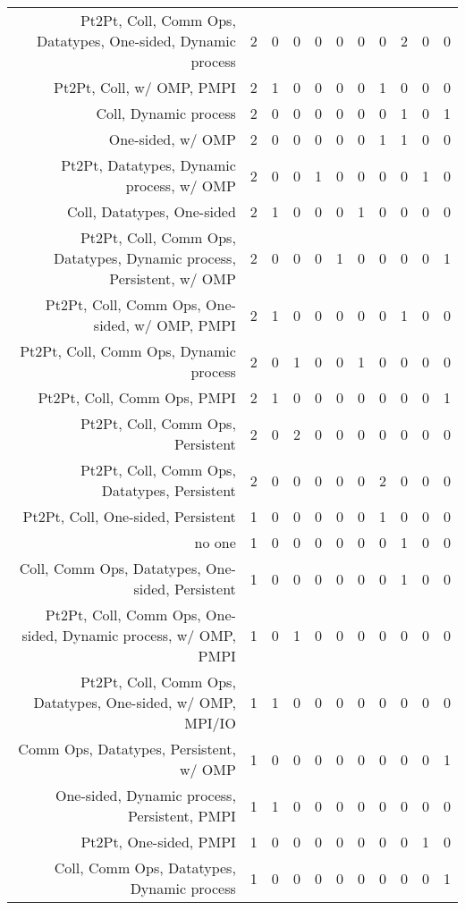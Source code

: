 {\begin{landscape}
\begin{longtable}[htb]{r|c|c|c|c|c|c|c|c|c|c}
{Pt2Pt, Coll, Comm Ops, Datatypes, One-sided, Dynamic process} & 2 & 0 & 0 & 0 & 0 & 0 & 0 & 2 & 0 & 0 \\%
{Pt2Pt, Coll, w/ OMP, PMPI} & 2 & 1 & 0 & 0 & 0 & 0 & 1 & 0 & 0 & 0 \\%
{Coll, Dynamic process} & 2 & 0 & 0 & 0 & 0 & 0 & 0 & 1 & 0 & 1 \\%
{One-sided, w/ OMP} & 2 & 0 & 0 & 0 & 0 & 0 & 1 & 1 & 0 & 0 \\%
{Pt2Pt, Datatypes, Dynamic process, w/ OMP} & 2 & 0 & 0 & 1 & 0 & 0 & 0 & 0 & 1 & 0 \\%
{Coll, Datatypes, One-sided} & 2 & 1 & 0 & 0 & 0 & 1 & 0 & 0 & 0 & 0 \\%
{Pt2Pt, Coll, Comm Ops, Datatypes, Dynamic process, Persistent, w/ OMP} & 2 & 0 & 0 & 0 & 1 & 0 & 0 & 0 & 0 & 1 \\%
{Pt2Pt, Coll, Comm Ops, One-sided, w/ OMP, PMPI} & 2 & 1 & 0 & 0 & 0 & 0 & 0 & 1 & 0 & 0 \\%
{Pt2Pt, Coll, Comm Ops, Dynamic process} & 2 & 0 & 1 & 0 & 0 & 1 & 0 & 0 & 0 & 0 \\%
{Pt2Pt, Coll, Comm Ops, PMPI} & 2 & 1 & 0 & 0 & 0 & 0 & 0 & 0 & 0 & 1 \\%
{Pt2Pt, Coll, Comm Ops, Persistent} & 2 & 0 & 2 & 0 & 0 & 0 & 0 & 0 & 0 & 0 \\%
{Pt2Pt, Coll, Comm Ops, Datatypes, Persistent} & 2 & 0 & 0 & 0 & 0 & 0 & 2 & 0 & 0 & 0 \\%
{Pt2Pt, Coll, One-sided, Persistent} & 1 & 0 & 0 & 0 & 0 & 0 & 1 & 0 & 0 & 0 \\%
{no one} & 1 & 0 & 0 & 0 & 0 & 0 & 0 & 1 & 0 & 0 \\%
{Coll, Comm Ops, Datatypes, One-sided, Persistent} & 1 & 0 & 0 & 0 & 0 & 0 & 0 & 1 & 0 & 0 \\%
{Pt2Pt, Coll, Comm Ops, One-sided, Dynamic process, w/ OMP, PMPI} & 1 & 0 & 1 & 0 & 0 & 0 & 0 & 0 & 0 & 0 \\%
{Pt2Pt, Coll, Comm Ops, Datatypes, One-sided, w/ OMP, MPI/IO} & 1 & 1 & 0 & 0 & 0 & 0 & 0 & 0 & 0 & 0 \\%
{Comm Ops, Datatypes, Persistent, w/ OMP} & 1 & 0 & 0 & 0 & 0 & 0 & 0 & 0 & 0 & 1 \\%
{One-sided, Dynamic process, Persistent, PMPI} & 1 & 1 & 0 & 0 & 0 & 0 & 0 & 0 & 0 & 0 \\%
{Pt2Pt, One-sided, PMPI} & 1 & 0 & 0 & 0 & 0 & 0 & 0 & 0 & 1 & 0 \\%
{Coll, Comm Ops, Datatypes, Dynamic process} & 1 & 0 & 0 & 0 & 0 & 0 & 0 & 0 & 0 & 1 \\%

\end{longtable}
\end{landscape}}
